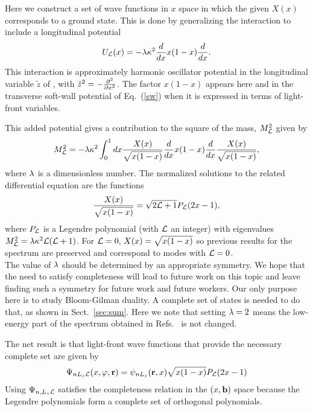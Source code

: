 \documentclass[aps,prd,amsmath,longbibliography]{revtex4-1}
\newcommand{\eq}[1]{Eq.~(\ref{#1})}
\def\bea{\begin{eqnarray}}
\def\eea{\end{eqnarray}}\def\a{\alpha}\newcommand{\bfk}{{\bf k}}\newcommand{\bfq}{{\bf q}}
\def\calL{{\cal L}}\def\cL{{\cal L}}\def\GX{\Gamma_X}\def\o{\omega}\def\bfb{{\bf b}}
\begin{document}
{Here we construct 
a set of wave functions in $x$ space in which the given $X(x) $ corresponds to a ground state. This is done by generalizing the interaction to include a longitudinal potential 
\bea U_\calL(x)=-\l \k^2 {d\over dx}x(1-x) {d\over dx}.\label{UL}\eea
This  interaction   is approximately harmonic oscillator potential in the longitudinal variable $\tilde z$ of \cite{Miller:2019ysh}, with $\tilde z^2=-{\partial^2 \over \partial x^2}$. The factor $x(1-x)$ appears here and in the transverse soft-wall potential of \eq{sw} when it is expressed in terms of light-front variables.

This added potential  gives a contribution to the square of the mass, $M_\calL^2$ given by
\bea M^2_\calL=-
\lambda\k^2\int_0^1dx {X(x)\over \sqrt{x(1-x)}}{d\over dx}x(1-x) {d\over dx} {X(x)\over \sqrt{x(1-x)}},\label{L}\eea
where $\lambda$ is a dimensionless number.
The normalized  solutions to the related differential equation are the functions 
\bea  {X(x)\over \sqrt{x(1-x)}}=\sqrt{2\calL+1} P_\calL(2x-1),\label{UL1}\eea 
where $P_\calL$ is a Legendre polynomial (with $\calL$ an integer) with
eigenvalues 
$M_\calL^2=\lambda\k^2\calL(\calL+1)$.
For $\calL=0,\, X(x)=\sqrt{x(1-x)}$ so previous results for the spectrum are preserved and correspond to modes with $\calL=0$.\\

The value of $\lambda$ should be determined by an appropriate symmetry. We hope that the need to satisfy completeness will lead to future work on this topic and leave 
finding such a symmetry for future work and future workers.  Our only purpose here is to study Bloom-Gilman duality. A complete set of states is needed to do that, as shown in Sect.~\ref{sec:sum}.
 Here we note that setting $\lambda=2$ means the low-energy part of the spectrum obtained in Refs.~\cite{PhysRevD.91.045040,PhysRevD.91.085016}  is not changed. %
 
 
The net result is that   light-front wave functions that provide the necessary complete set are given by
\bea\Psi_{nL_z\calL}(x, \varphi, \bfr) = \psi_{nL_z}(\bfr,x) \sqrt{x(1-x)} P_\calL(2x-1)\eea
  Using $\Psi_{n,L_z\calL}$ satisfies the completeness relation  in the $(x,\bfb)$ space because the Legendre polynomials form a complete set of orthogonal polynomials.
 
}
\end{document}

